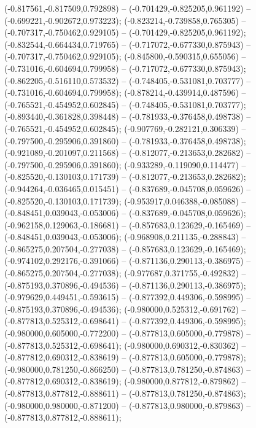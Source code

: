  (-0.817561,-0.817509,0.792898) -- (-0.701429,-0.825205,0.961192) -- (-0.699221,-0.902672,0.973223);
 (-0.823214,-0.739858,0.765305) -- (-0.707317,-0.750462,0.929105) -- (-0.701429,-0.825205,0.961192);
 (-0.832544,-0.664434,0.719765) -- (-0.717072,-0.677330,0.875943) -- (-0.707317,-0.750462,0.929105);
 (-0.845800,-0.590315,0.655056) -- (-0.731016,-0.604694,0.799958) -- (-0.717072,-0.677330,0.875943);
 (-0.862205,-0.516110,0.573532) -- (-0.748405,-0.531081,0.703777) -- (-0.731016,-0.604694,0.799958);
 (-0.878214,-0.439914,0.487596) -- (-0.765521,-0.454952,0.602845) -- (-0.748405,-0.531081,0.703777);
 (-0.893440,-0.361828,0.398448) -- (-0.781933,-0.376458,0.498738) -- (-0.765521,-0.454952,0.602845);
 (-0.907769,-0.282121,0.306339) -- (-0.797500,-0.295906,0.391860) -- (-0.781933,-0.376458,0.498738);
 (-0.921089,-0.201097,0.211568) -- (-0.812077,-0.213653,0.282682) -- (-0.797500,-0.295906,0.391860);
 (-0.933289,-0.119090,0.114477) -- (-0.825520,-0.130103,0.171739) -- (-0.812077,-0.213653,0.282682);
 (-0.944264,-0.036465,0.015451) -- (-0.837689,-0.045708,0.059626) -- (-0.825520,-0.130103,0.171739);
 (-0.953917,0.046388,-0.085088) -- (-0.848451,0.039043,-0.053006) -- (-0.837689,-0.045708,0.059626);
 (-0.962158,0.129063,-0.186681) -- (-0.857683,0.123629,-0.165469) -- (-0.848451,0.039043,-0.053006);
 (-0.968908,0.211135,-0.288843) -- (-0.865275,0.207504,-0.277038) -- (-0.857683,0.123629,-0.165469);
 (-0.974102,0.292176,-0.391066) -- (-0.871136,0.290113,-0.386975) -- (-0.865275,0.207504,-0.277038);
 (-0.977687,0.371755,-0.492832) -- (-0.875193,0.370896,-0.494536) -- (-0.871136,0.290113,-0.386975);
 (-0.979629,0.449451,-0.593615) -- (-0.877392,0.449306,-0.598995) -- (-0.875193,0.370896,-0.494536);
 (-0.980000,0.525312,-0.691762) -- (-0.877813,0.525312,-0.698641) -- (-0.877392,0.449306,-0.598995);
 (-0.980000,0.605000,-0.772200) -- (-0.877813,0.605000,-0.779878) -- (-0.877813,0.525312,-0.698641);
 (-0.980000,0.690312,-0.830362) -- (-0.877812,0.690312,-0.838619) -- (-0.877813,0.605000,-0.779878);
 (-0.980000,0.781250,-0.866250) -- (-0.877813,0.781250,-0.874863) -- (-0.877812,0.690312,-0.838619);
 (-0.980000,0.877812,-0.879862) -- (-0.877813,0.877812,-0.888611) -- (-0.877813,0.781250,-0.874863);
 (-0.980000,0.980000,-0.871200) -- (-0.877813,0.980000,-0.879863) -- (-0.877813,0.877812,-0.888611);
